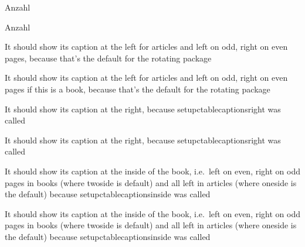 \documentclass[12pt,twoside]{article}
\begin{document}
\clearpage
{}
 {\tnote{}}
{\FL Anzahl \LL }

 {\tnote{}}
{\FL Anzahl\LL }

 {}{\FL
     It should show its caption at the left for articles\NN
     and left on odd, right on even pages,\NN
     because that's the default for the rotating package\LL
}

 {}{\FL
     It should show its caption at the left for articles\NN
     and left on odd, right on even pages if this is a book,\NN
     because that's the default for the rotating package\LL
}


 {}{\FL
     It should show its caption at the right,\NN
     because setupctable{captionsright} was called\LL
}

 {}{\FL
     It should show its caption at the right,\NN
     because setupctable{captionsright} was called\LL
}


 {}{\FL
     It should show its caption at the inside of the book,\NN
     i.e.\ left on even, right on odd pages in books (where twoside is default)\NN
     and all left in articles (where oneside is the default)\NN
     because setupctable{captionsinside} was called\LL
}

 {}{\FL
     It should show its caption at the inside of the book,\NN
     i.e.\ left on even, right on odd pages in books (where twoside is default)\NN
     and all left in articles (where oneside is the default)\NN
     because setupctable{captionsinside} was called\LL
}
\end{document}
